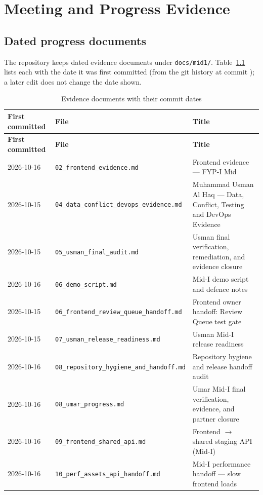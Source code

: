 \chapter{Meeting and Progress Evidence}\label{app:progress}
\section*{Dated progress documents}
The repository keeps dated evidence documents under \texttt{docs/mid1/}. Table~\ref{tab:progressdocs} lists each with the date it was first committed (from the git history at commit ); a later edit does not change the date shown.
\begin{longtable}{p{}p{}p{}}
\caption{Evidence documents with their commit dates}\label{tab:progressdocs}\\
\toprule \textbf{First committed} & \textbf{File} & \textbf{Title} \\ \midrule \endfirsthead
\toprule \textbf{First committed} & \textbf{File} & \textbf{Title} \\ \midrule \endhead
2026-10-16 & \texttt{02\_frontend\_evidence.md} & Frontend evidence --- FYP-I Mid \\
2026-10-15 & \texttt{04\_data\_conflict\_devops\_evidence.md} & Muhammad Usman Al Haq --- Data, Conflict, Testing and DevOps Evidence \\
2026-10-15 & \texttt{05\_usman\_final\_audit.md} & Usman final verification, remediation, and evidence closure \\
2026-10-16 & \texttt{06\_demo\_script.md} & Mid-I demo script and defence notes \\
2026-10-15 & \texttt{06\_frontend\_review\_queue\_handoff.md} & Frontend owner handoff: Review Queue test gate \\
2026-10-15 & \texttt{07\_usman\_release\_readiness.md} & Usman Mid-I release readiness \\
2026-10-16 & \texttt{08\_repository\_hygiene\_and\_handoff.md} & Repository hygiene and release handoff audit \\
2026-10-16 & \texttt{08\_umar\_progress.md} & Umar Mid-I final verification, evidence, and partner closure \\
2026-10-16 & \texttt{09\_frontend\_shared\_api.md} & Frontend $\to$ shared staging API (Mid-I) \\
2026-10-16 & \texttt{10\_perf\_assets\_api\_handoff.md} & Mid-I performance handoff --- slow frontend loads \\

\end{longtable}
